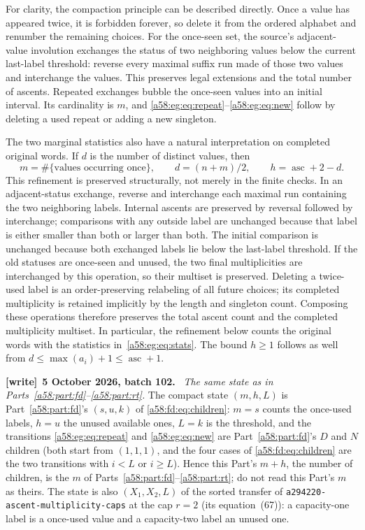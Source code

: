 \documentclass[11pt,letterpaper]{article}
\newcommand{\file}[1]{\nolinkurl{#1}}
\theoremstyle{remark}
\newcommand{\asc}{\operatorname{asc}}
\newenvironment{writenote}[1][]{\par\smallskip\begingroup\small
 \noindent\textbf{[write]}\if\relax\detokenize{#1}\relax\else~\textbf{#1.}\fi\ }%
 {\par\endgroup\smallskip}
\begin{document}
For clarity, the compaction principle can be described directly. Once a value has appeared twice, it is forbidden forever, so delete it from the ordered alphabet and renumber the remaining choices. For the once-seen set, the source's adjacent-value involution exchanges the status of two neighboring values below the current last-label threshold: reverse every maximal suffix run made of those two values and interchange the values. This preserves legal extensions and the total number of ascents. Repeated exchanges bubble the once-seen values into an initial interval. Its cardinality is $m$, and \eqref{a58:eg:eq:repeat}--\eqref{a58:eg:eq:new} follow by deleting a used repeat or adding a new singleton.

The two marginal statistics also have a natural interpretation on completed original words. If $d$ is the number of distinct values, then
\begin{equation}\label{a58:eg:eq:stats}
 m=\#\{\text{values occurring once}\},\qquad
 d=(n+m)/2,\qquad h=\asc+2-d.
\end{equation}
This refinement is preserved structurally, not merely in the finite checks. In an adjacent-status exchange, reverse and interchange each maximal run containing the two neighboring labels. Internal ascents are preserved by reversal followed by interchange; comparisons with any outside label are unchanged because that label is either smaller than both or larger than both. The initial comparison is unchanged because both exchanged labels lie below the last-label threshold. If the old statuses are once-seen and unused, the two final multiplicities are interchanged by this operation, so their multiset is preserved. Deleting a twice-used label is an order-preserving relabeling of all future choices; its completed multiplicity is retained implicitly by the length and singleton count. Composing these operations therefore preserves the total ascent count and the completed multiplicity multiset. In particular, the refinement below counts the original words with the statistics in~\eqref{a58:eg:eq:stats}. The bound $h\ge1$ follows as well from $d\le\max(a_i)+1\le\asc+1$.

\begin{writenote}[5 October 2026, batch 102]
\emph{The same state as in Parts~\ref{a58:part:fd}--\ref{a58:part:rt}.} The compact state $(m,h,L)$ is Part~\ref{a58:part:fd}'s $(s,u,k)$ of \eqref{a58:fd:eq:children}: $m=s$ counts the once-used labels, $h=u$ the unused available ones, $L=k$ is the threshold, and the transitions \eqref{a58:eg:eq:repeat} and \eqref{a58:eg:eq:new} are Part~\ref{a58:part:fd}'s $D$ and $N$ children (both start from $(1,1,1)$, and the four cases of \eqref{a58:fd:eq:children} are the two transitions with $i<L$ or $i\ge L$). Hence this Part's $m+h$, the number of children, is the $m$ of Parts~\ref{a58:part:fd}--\ref{a58:part:rt}; do not read this Part's $m$ as theirs. The state is also $(X_1,X_2,L)$ of the sorted transfer of \file{a294220-ascent-multiplicity-caps} at the cap $r=2$ (its equation~(67)): a capacity-one label is a once-used value and a capacity-two label an unused one.
\end{writenote}
\end{document}

